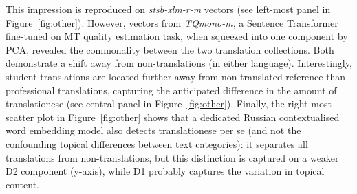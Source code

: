 This impression is reproduced on \textit{stsb-xlm-r-m} vectors (see left-most panel in Figure~\ref{fig:other}). 
However, vectors from \textit{TQmono-m}, a Sentence Transformer fine-tuned on MT quality estimation task, when squeezed into one component by PCA, revealed the commonality between the two translation collections. Both demonstrate a shift away from non-translations (in either language). Interestingly, student translations are located further away from non-translated reference than professional translations, capturing the anticipated difference in the amount of translationese (see central panel in Figure~\ref{fig:other}). 
Finally, the right-most scatter plot in Figure~\ref{fig:other} shows that a dedicated Russian contextualised word embedding model also detects translationese per se (and not the confounding topical differences between text categories): it separates all translations from non-translations, but this distinction is captured on a weaker D2 component (y-axis), while D1 probably captures the variation in topical content.   

